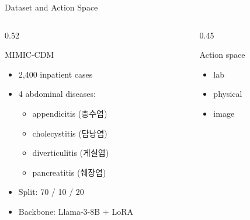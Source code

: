 \documentclass[11pt,notheorems,hyperref={pdfauthor=whatever}]{beamer}
\begin{document}
\begin{frame}[t]{Dataset and Action Space}
\small
\begin{columns}[T,onlytextwidth]
\begin{column}{0.52\textwidth}
\begin{block}{MIMIC-CDM}
\begin{itemize}
  \item 2,400 inpatient cases
  \item 4 abdominal diseases:
  \begin{itemize}
    \item appendicitis (충수염)
    \item cholecystitis (담낭염)
    \item diverticulitis (게실염)
    \item pancreatitis (췌장염)
  \end{itemize}
  \item Split: 70 / 10 / 20
  \item Backbone: Llama-3-8B + LoRA
\end{itemize}
\end{block}
\end{column}
\begin{column}{0.45\textwidth}
\begin{block}{Action space}
\begin{itemize}
  \item lab
  \item physical
  \item image
\end{itemize}
\end{block}
\end{column}
\end{columns}
\end{frame}
\end{document}
